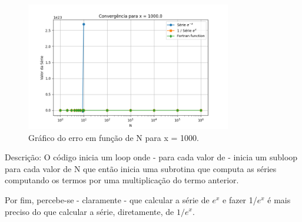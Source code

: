 \documentclass[12pt, a4paper]{article} %
\begin{document}
\begin{figure}[H]
    \centering
    \includegraphics[width=0.8\textwidth]{../images/grafico_x_1000.0.png}
    \caption{Gr\'afico do erro em fun\c{c}\~ao de N para x = 1000.}
\end{figure}

Descri\c{c}\~ao: O c\'odigo inicia um loop onde - para cada valor de - inicia um subloop para cada valor de N que ent\~ao inicia uma subrotina que computa as s\'eries computando os termos por uma multiplica\c{c}\~ao do termo anterior.

Por fim, percebe-se - claramente - que calcular a s\'erie de $e^x$ e fazer 1/$e^x$ \'e mais preciso do que calcular a s\'erie, diretamente, de $1/e^x$.
\end{document}
